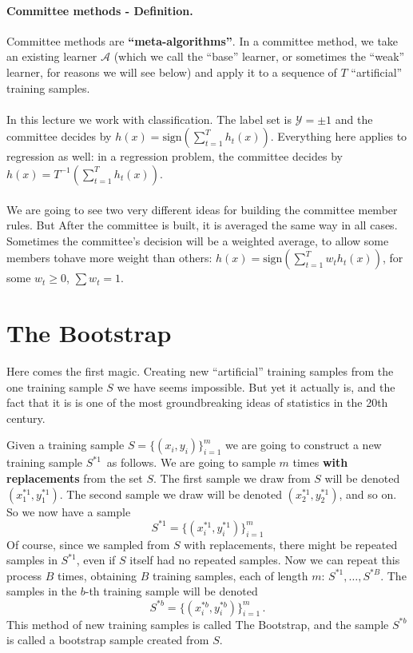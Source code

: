 \documentclass[11pt]{article}
\newcommand{\Ac}{\mathcal{A}}
\newcommand{\Yc}{\mathcal{Y}}
\begin{document}
\paragraph{Committee methods - Definition.} 
Committee methods are {\bf ``meta-algorithms''}. 
In a committee method, we take an existing learner $\Ac$ (which we call the
  ``base'' learner, or sometimes the ``weak'' learner, for reasons we will see
below) and apply it to a
sequence of $T$ ``artificial'' training samples.
\\~\\
In this lecture we work with classification. The label set is
$\Yc={\pm 1}$ and the committee
decides by $h(x) = \text{sign} \left( \sum_{t=1}^T h_t(x) \right)$. 
Everything here applies to regression as well: in a regression problem, the
committee decides by $h(x) = T^{-1}\left( \sum_{t=1}^T h_t(x) \right)$.
\\~\\
We are going to see two very different ideas for building the committee member
rules. 
%
But After the committee is built, it is averaged the same way in all cases.
Sometimes the committee's decision will be a weighted average, to allow some
members tohave more weight than others:
$h(x) = \text{sign} \left( \sum_{t=1}^T w_t h_t(x) \right)$, 
for some  $w_t\geq 0$, $\sum w_t=1$.




\section{The Bootstrap}

Here comes the first magic. Creating new ``artificial'' training samples from
the one training sample $S$ we have seems impossible.
 But yet it actually is, and the fact that it is is one of
the most groundbreaking ideas of statistics in the 20th century. 

Given a training sample $S=\{(x_i,y_i)\}_{i=1}^m$ we are going to construct a
new training sample $S^{*1}$ as follows. We are going to sample $m$ times {\bf
with replacements} from the set $S$. The first sample we draw from $S$ will be denoted $(x^{*1}_1,y^{*1}_1)$. The second sample we draw will be denoted 
$(x^{*1}_2,y^{*1}_2)$, and so on. So we now have a sample
\[
  S^{*1}=\{(x^{*1}_i,y^{*1}_i)\}_{i=1}^m
\]
Of course, since we sampled from $S$ with replacements, there might be repeated
samples in $S^{*1}$, even if $S$ itself had no repeated samples. 
Now we can repeat this process $B$ times, obtaining $B$ training samples, each
of length $m$: $S^{*1},\ldots, S^{*B}$. The samples in the $b$-th training
sample will be denoted 
\[
  S^{*b}=\{(x^{*b}_i,y^{*b}_i)\}_{i=1}^m \,.
\]
%
\noindent This method of new training samples is called The Bootstrap, and the sample
$S^{*b}$ is called a bootstrap sample created from $S$. 
\end{document}
